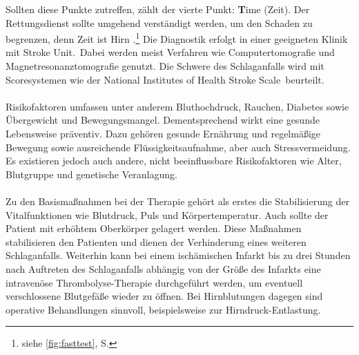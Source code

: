 Sollten diese Punkte zutreffen, zählt der vierte Punkt: \textbf{T}ime (Zeit). Der Rettungsdienst sollte umgehend verständigt werden, um den Schaden zu begrenzen, denn \glqq Zeit ist Hirn \grqq.\cite{Src:ApoFlex}\footnote[2]{siehe \autoref{fig:fasttest}, S. \pageref{fig:fasttest}}
Die Diagnostik erfolgt in einer geeigneten Klinik mit \glqq Stroke Unit\grqq .~Dabei werden meist Verfahren wie Computertomografie und Magnetresonanztomografie genutzt. Die Schwere des Schlaganfalls wird mit Scoresystemen wie der \glqq National Institutes of Health Stroke Scale\grqq ~beurteilt.
\\ \\
Risikofaktoren umfassen unter anderem Bluthochdruck, Rauchen, Diabetes sowie Übergewicht und Bewegungsmangel. Dementsprechend wirkt eine gesunde Lebensweise präventiv. Dazu gehören gesunde Ernährung und regelmäßige Bewegung sowie ausreichende Flüssigkeitsaufnahme, aber auch Stressvermeidung.\cite{Src:ApoFlex} Es existieren jedoch auch andere, nicht beeinflussbare Risikofaktoren wie Alter, Blutgruppe und genetische Veranlagung.
\\ \\
Zu den Basismaßnahmen bei der Therapie gehört als erstes die Stabilisierung der Vitalfunktionen wie Blutdruck, Puls und Körpertemperatur. Auch sollte der Patient mit erhöhtem Oberkörper gelagert werden. Diese Maßnahmen stabilisieren den Patienten und dienen der Verhinderung eines weiteren Schlaganfalls. Weiterhin kann bei einem ischämischen Infarkt bis zu drei Stunden nach Auftreten des Schlaganfalls abhängig von der Größe des Infarkts eine intravenöse Thrombolyse-Therapie durchgeführt werden, um eventuell verschlossene Blutgefäße wieder zu öffnen. Bei Hirnblutungen dagegen sind operative Behandlungen sinnvoll, beispielsweise zur Hirndruck-Entlastung.\cite{Src:ApoFlex}
